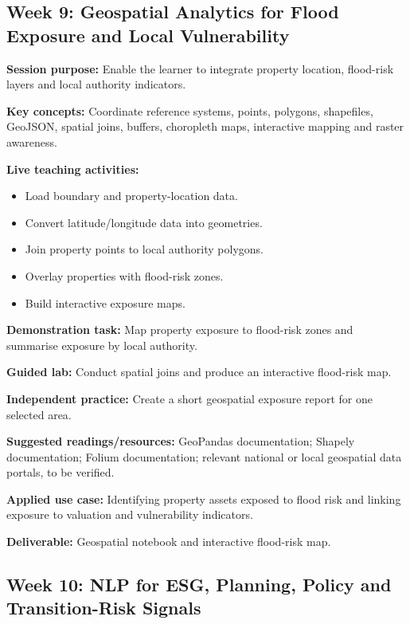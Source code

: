 \documentclass[
  a4paper,
]{article}
\providecommand{\tightlist}{%
  \setlength{\itemsep}{0pt}\setlength{\parskip}{0pt}}
\begin{document}
\subsection{Week 9: Geospatial Analytics for Flood Exposure and Local
Vulnerability}\label{week-9-geospatial-analytics-for-flood-exposure-and-local-vulnerability}

\textbf{Session purpose:} Enable the learner to integrate property
location, flood-risk layers and local authority indicators.

\textbf{Key concepts:} Coordinate reference systems, points, polygons,
shapefiles, GeoJSON, spatial joins, buffers, choropleth maps,
interactive mapping and raster awareness.

\textbf{Live teaching activities:}

\begin{itemize}
\tightlist
\item
  Load boundary and property-location data.
\item
  Convert latitude/longitude data into geometries.
\item
  Join property points to local authority polygons.
\item
  Overlay properties with flood-risk zones.
\item
  Build interactive exposure maps.
\end{itemize}

\textbf{Demonstration task:} Map property exposure to flood-risk zones
and summarise exposure by local authority.

\textbf{Guided lab:} Conduct spatial joins and produce an interactive
flood-risk map.

\textbf{Independent practice:} Create a short geospatial exposure report
for one selected area.

\textbf{Suggested readings/resources:} GeoPandas documentation; Shapely
documentation; Folium documentation; relevant national or local
geospatial data portals, to be verified.

\textbf{Applied use case:} Identifying property assets exposed to flood
risk and linking exposure to valuation and vulnerability indicators.

\textbf{Deliverable:} Geospatial notebook and interactive flood-risk
map.

\subsection{Week 10: NLP for ESG, Planning, Policy and Transition-Risk
Signals}\label{week-10-nlp-for-esg-planning-policy-and-transition-risk-signals}
\end{document}
